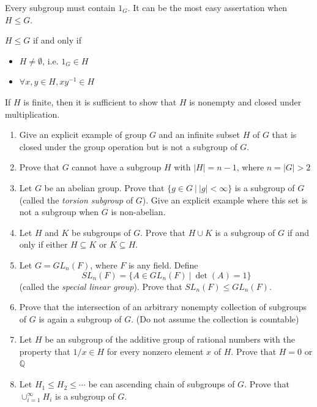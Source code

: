 \documentclass[12pt, a4paper, openany, twoside]{book}
\theoremstyle{definition}
\theoremstyle{remark}
\newcommand{\BQ}{{\mathbb {Q}}} \newcommand{\BR}{{\mathbb {R}}}
\theoremstyle{plain}
\numberwithin{equation}{section}
\begin{document}
Every subgroup must contain $1_G$. It can be the most easy assertation when $H \leq G$. 

\begin{tcolorbox}[colback=yellow!10!white,colframe=green!75!black,title=Subgroup Criterion]

$H \leq G$ if and only if 
\begin{itemize}
    \item $H \neq \emptyset$, i.e. $1_G \in H$
    \item $\forall x, y \in H, xy^{-1} \in H$
\end{itemize}
If $H$ is finite, then it is sufficient to show that $H$ is nonempty and closed under multiplication.

\end{tcolorbox}

\begin{tcolorbox}[colback=yellow!10!white,colframe=violet!75!white,title=Exercise Sec 2.1.,breakable]

\begin{enumerate}
    \item Give an explicit example of group $G$ and an infinite subset $H$ of $G$ that is closed under the group operation but is not a subgroup of $G$.
    \item Prove that $G$ cannot have a subgroup $H$ with $|H| = n - 1$, where $n = |G| > 2$
    \item Let $G$ be an abelian group. Prove that $\{g \in G ~|~ |g| < \infty\}$ is a subgroup of $G$ (called the \textit{torsion subgroup} of $G$). Give an explicit example where this set is not a subgroup when $G$ is non-abelian.
    \item Let $H$ and $K$ be subgroups of $G$. Prove that $H \cup K$ is a subgroup of $G$ if and only if either $H \subseteq K$ or $K \subseteq H$.
    \item Let $G = GL_n(F)$, where $F$ is any field. Define 
    \[SL_n(F) = \{A \in GL_n(F)~|~\det(A) = 1\}\]
    (called the \textit{special linear group}). Prove that $SL_n(F) \leq GL_n(F)$.
    \item Prove that the intersection of an arbitrary nonempty collection of subgroups of $G$ is again a subgroup of $G$. (Do not assume the collection is countable)
    \item Let $H$ be an subgroup of the additive group of rational numbers with the property that $1/x \in H$ for every nonzero element $x$ of $H$. Prove that $H = 0$ or $\BQ$
    \item Let $H_1 \leq H_2 \leq \cdots $ be can ascending chain of subgroups of $G$. Prove that $\cup_{i=1}^{\infty} H_i$ is a subgroup of $G$.
\end{enumerate}

\end{tcolorbox}
\end{document}
